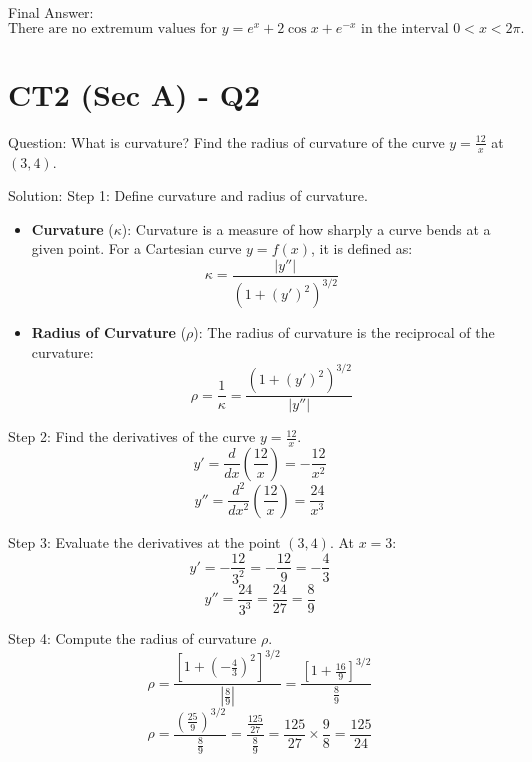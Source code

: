 \documentclass{article}
\begin{document}
Final Answer:
\[
\boxed{\text{There are no extremum values for } y = e^x + 2\cos x + e^{-x} \text{ in the interval } 0 < x < 2\pi.}
\]

\section*{CT2 (Sec A) - Q2}
Question:
What is curvature? Find the radius of curvature of the curve $y = \frac{12}{x}$ at $(3, 4)$.

Solution:
Step 1: Define curvature and radius of curvature.
\begin{itemize}
    \item \textbf{Curvature} ($\kappa$): Curvature is a measure of how sharply a curve bends at a given point. For a Cartesian curve $y = f(x)$, it is defined as:
    \[
    \kappa = \frac{|y''|}{\left(1 + (y')^2\right)^{3/2}}
    \]
    \item \textbf{Radius of Curvature} ($\rho$): The radius of curvature is the reciprocal of the curvature:
    \[
    \rho = \frac{1}{\kappa} = \frac{\left(1 + (y')^2\right)^{3/2}}{|y''|}
    \]
\end{itemize}

Step 2: Find the derivatives of the curve $y = \frac{12}{x}$.
\[
y' = \frac{d}{dx}\left(\frac{12}{x}\right) = -\frac{12}{x^2}
\]
\[
y'' = \frac{d^2}{dx^2}\left(\frac{12}{x}\right) = \frac{24}{x^3}
\]

Step 3: Evaluate the derivatives at the point $(3, 4)$.
At $x = 3$:
\[
y' = -\frac{12}{3^2} = -\frac{12}{9} = -\frac{4}{3}
\]
\[
y'' = \frac{24}{3^3} = \frac{24}{27} = \frac{8}{9}
\]

Step 4: Compute the radius of curvature $\rho$.
\[
\rho = \frac{\left[1 + \left(-\frac{4}{3}\right)^2\right]^{3/2}}{\left|\frac{8}{9}\right|} = \frac{\left[1 + \frac{16}{9}\right]^{3/2}}{\frac{8}{9}}
\]
\[
\rho = \frac{\left(\frac{25}{9}\right)^{3/2}}{\frac{8}{9}} = \frac{\frac{125}{27}}{\frac{8}{9}} = \frac{125}{27} \times \frac{9}{8} = \frac{125}{24}
\]
\end{document}
